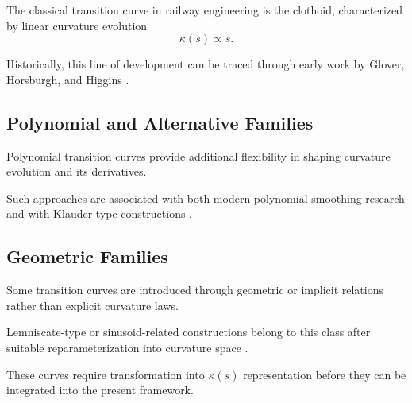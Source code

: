 \begin{remark}
The classical transition curve in railway engineering is the clothoid,
characterized by linear curvature evolution
\[
\kappa(s) \propto s.
\]
\end{remark}

\begin{remark}
Historically, this line of development can be traced through early work
by Glover, Horsburgh, and Higgins
\cite{Glover1900TransitionCurves,Horsburgh1913TransitionCurve,Higgins1922TransitionSpiral}.
\end{remark}

\subsection{Polynomial and Alternative Families}

\begin{remark}
Polynomial transition curves provide additional flexibility in shaping
curvature evolution and its derivatives.
\end{remark}

\begin{remark}
Such approaches are associated with both modern polynomial smoothing
research and with Klauder-type constructions
\cite{ZboinskiWoznica2017Polynomial,Klauder2001BetterWay,Klauder2009US}.
\end{remark}


\subsection{Geometric Families}

\begin{remark}
Some transition curves are introduced through geometric or implicit
relations rather than explicit curvature laws.
\end{remark}

\begin{example}
Lemniscate-type or sinusoid-related constructions belong to this class
after suitable reparameterization into curvature space
\cite{Pirti2016Transrapid}.
\end{example}

\begin{remark}
These curves require transformation into $\kappa(s)$ representation
before they can be integrated into the present framework.
\end{remark}

